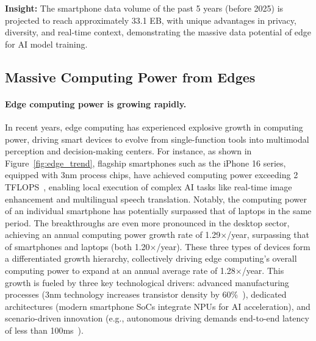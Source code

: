 \begin{insights}
    \textbf{Insight:} The smartphone data volume of the past 5 years (before 2025) is projected to reach approximately 33.1 EB, with unique advantages in privacy, diversity, and real-time context, demonstrating the massive data potential of edge for AI model training.
\end{insights}
   



\subsection{Massive Computing Power from Edges}\label{subsec:edge_compute}



\paragraph{Edge computing power is growing rapidly.}
In recent years, edge computing has experienced explosive growth in computing power, driving smart devices to evolve from single-function tools into multimodal perception and decision-making centers. For instance, as shown in Figure~\ref{fig:edge_trend}, flagship smartphones such as the iPhone 16 series, equipped with 3nm process chips, have achieved computing power exceeding 2 TFLOPS~\cite{apple2024iphone16pro}, enabling local execution of complex AI tasks like real-time image enhancement and multilingual speech translation. 
Notably, the computing power of an individual smartphone has potentially surpassed that of laptops in the same period.
The breakthroughs are even more pronounced in the desktop sector,
achieving an annual computing power growth rate of 1.29$\times$/year, surpassing that of smartphones and laptops (both 1.20$\times$/year). 
These three types of devices form a differentiated growth hierarchy, collectively driving edge computing's overall computing power to expand at an annual average rate of 1.28$\times$/year.
This growth is fueled by three key technological drivers: advanced manufacturing processes (3nm technology increases transistor density by 60\%~\cite{apple2024iphone16pro}), dedicated architectures (modern smartphone SoCs integrate NPUs for AI acceleration), and scenario-driven innovation (e.g., autonomous driving demands end-to-end latency of less than 100ms~\cite{nvidia2023}).
